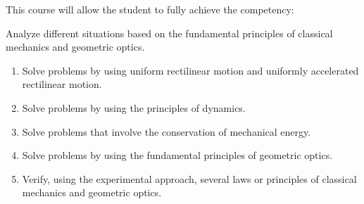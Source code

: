 {This course will allow the student to fully achieve the competency:\\
\smallskip

Analyze different situations based on the fundamental principles of classical mechanics and geometric optics.
\smallskip

\begin{enumerate}
\item Solve problems by using uniform rectilinear motion and uniformly accelerated rectilinear motion.
\item Solve problems by using the principles of dynamics.
\item Solve problems that involve the conservation of mechanical energy.
\item Solve problems by using the fundamental principles of geometric optics.
\item Verify, using the experimental approach, several laws or principles of classical mechanics and geometric optics.
\end{enumerate}
}
